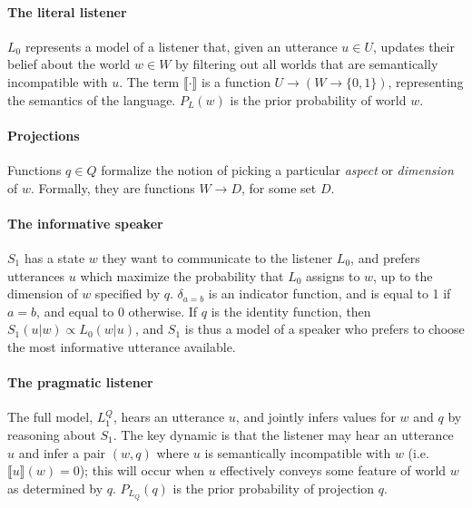 \documentclass[9pt,twocolumn,twoside,lineno]{pnas-new}
\newcommand{\Listener}{L}
\newcommand{\QLONE}{\Listener_{{1}}^{{Q}}}
\begin{document}
	\paragraph{The literal listener} $L_0$ represents a model of a listener that, given an utterance $u\in U$, updates their belief about the world $w\in W$ by filtering out all worlds that are semantically incompatible with $u$. The term $\llbracket\cdot\rrbracket$ is a function $U\to(W\to\{0, 1\})$, representing the semantics of the language. $P_L(w)$ is the prior probability of world $w$. 


	\paragraph{Projections} 
	Functions $q\in Q$ formalize the notion of picking a particular \emph{aspect} or \emph{dimension} of $w$. Formally, they are functions $W \to D$, for some set $D$.
	

	\paragraph{The informative speaker} $S_1$ has a state $w$ they want to communicate to the listener $L_0$, and prefers utterances $u$ which maximize the probability that $L_0$ assigns to $w$, up to the dimension of $w$ specified by $q$. $\delta_{a=b}$ is an indicator function, and is equal to 1 if $a=b$, and equal to 0 otherwise. If $q$ is the identity function, then $S_1(u|w) \propto L_0(w|u)$, and $S_1$ is thus a model of a speaker who prefers to choose the most informative utterance available. 
	
	\paragraph{The pragmatic listener} The full model, $\QLONE$, hears an utterance $u$, and jointly infers values for $w$ and $q$ by reasoning about $S_1$. The key dynamic is that the listener may hear an utterance $u$ and infer a pair $(w,q)$ where $u$ is semantically incompatible with $w$ (i.e. $\llbracket u\rrbracket(w)=0$); this will occur when $u$ effectively conveys some feature of world $w$ as determined by $q$. $P_{L_Q}(q)$ is the prior probability of projection $q$.
\end{document}
